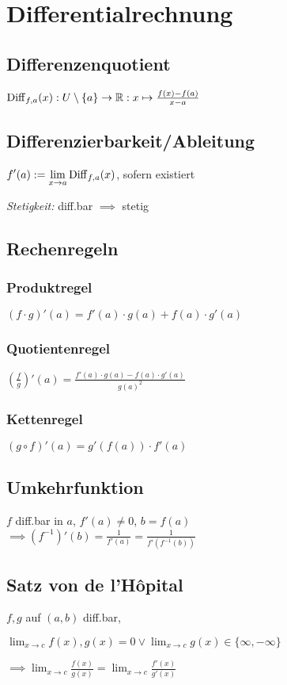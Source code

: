\section*{Differentialrechnung}

\subsection*{Differenzenquotient}
$\operatorname{Diff}_{f,a}(x): U\setminus\{a\}\to\mathbb{R}: x\mapsto\frac{f(x)-f(a)}{x-a}$

\subsection*{Differenzierbarkeit/Ableitung}
$\displaystyle f'(a) := \lim_{x\to a}\operatorname{Diff}_{f,a}(x)$, sofern existiert

\textit{Stetigkeit:} diff.bar $\implies$ stetig

\subsection*{Rechenregeln}

\subsubsection*{Produktregel}
$(f \cdot g)'(a)=f'(a)\cdot g(a)+f(a)\cdot g'(a)$

\subsubsection*{Quotientenregel}
$\left(\frac{f}{g}\right)'(a)=\frac{f'(a)\cdot g(a) - f(a)\cdot g'(a)}{g(a)^2}$

\subsubsection*{Kettenregel}
$(g\circ f)'(a) = g'(f(a))\cdot f'(a)$

\subsection*{Umkehrfunktion}
$f$ diff.bar in $a$, $f'(a)\neq0$, $b=f(a)$ \\
$\implies (f^{-1})'(b) = \frac{1}{f'(a)}=\frac{1}{f'(f^{-1}(b))}$

\subsection*{Satz von de l'H\^opital}
$f,g$ auf $(a,b)$ diff.bar,

$\displaystyle \lim_{x\to c}f(x),g(x)=0 \lor
\lim_{x\to c}g(x)\in\{\infty,-\infty\}$

$\displaystyle \implies \lim_{x\to c}\frac{f(x)}{g(x)}=\lim_{x\to c}\frac{f'(x)}{g'(x)}$
